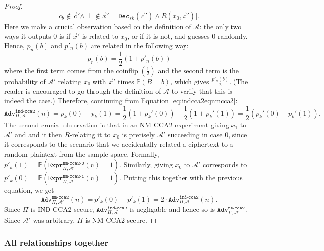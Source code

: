 \documentclass{article}
\theoremstyle{definition}
\newcommand{\Dec}{\texttt{Dec}}
\newcommand{\A}{\mathcal{A}}
\newcommand{\Prob}{\mathbb{P}}
\newcommand{\Expr}[2]{\texttt{Expr}^{\texttt{#1}}_{#2}}
\newcommand{\Adv}[2]{\texttt{Adv}^{\texttt{#1}}_{#2}}
\begin{document}
\begin{proof}
\[    c_b \not\in \vec{c}' \land \perp \not\in \vec{x}' = \Dec_{sk}(\vec{c}') \land R(x_0, \vec{x}')].
  \]
  Here we make a crucial observation based on the definition of $\A$: the only
  two ways it outputs $0$ is if $\vec{x}'$ is related to $x_0$, or if it is not,
  and guesses $0$ randomly. Hence, $p_n(b)$ and $p'_n(b)$ are related in the
  following way:
  \[
    p_n(b) = \frac12 (1 + p'_n(b))
  \]
  where the first term comes from the coinflip $(\frac12)$ and the second term
  is the probability of $\A'$ relating $x_0$ with $\vec{x}'$ times $\Prob(B =
  b)$, which gives $\frac{p'_n(b)}{2}$. (The reader is encouraged to go through
  the definition of $\A$ to verify that this is indeed the case.)
  Therefore, continuing from Equation \ref{eq:indcca2eqnmcca2}:
  \[
    \Adv{ind-cca2}{\Pi, \A}(n) = p_k(0) - p_k(1) = \frac12 (1 + p_k'(0)) -
    \frac12 (1 + p_k'(1)) = \frac12 (p_k'(0) - p_k'(1)).
  \]
  The second crucial observation is that in an NM-CCA2 experiment giving $x_1$
  to $\A'$ and and it then $R$-relating it to $x_0$ is precisely $\A'$
  succeeding in case 0, since it corresponds to the scenario that we
  accidentally related a ciphertext to a random plaintext from the sample space.
  Formally, $p'_k(1) = \Prob(\Expr{nm-cca2-0}{\Pi, \A'}(n) = 1)$. Similarly,
  giving $x_0$ to $\A'$ corresponds to $p'_k(0) = \Prob(\Expr{nm-cca2-1}{\Pi, \A'}(n) =
  1)$. Putting this together with the previous equation, we get
  \[
    \Adv{nm-cca2}{\Pi, \A'}(n) = p'_k(0) - p'_k(1) = 2\cdot\Adv{ind-cca2}{\Pi, \A}(n).
  \]
  Since $\Pi$ is IND-CCA2 secure, $\Adv{ind-cca2}{\Pi, \A}$ is negligable and
  hence so is $\Adv{nm-cca2}{\Pi, \A'}$. Since $\A'$ was arbitrary, $\Pi$ is
  NM-CCA2 secure.
\end{proof}
\subsubsection{All relationships together}
\label{sec:allrelations}
\end{document}
